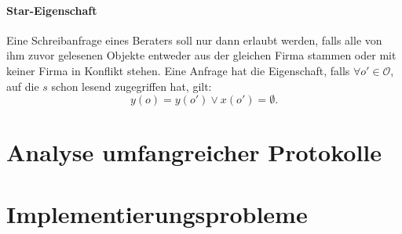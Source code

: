 \paragraph{Star-Eigenschaft}
Eine Schreibanfrage eines Beraters soll nur dann erlaubt werden, falls alle von ihm zuvor gelesenen Objekte entweder aus der gleichen Firma stammen oder mit keiner Firma in Konflikt stehen. Eine Anfrage hat die Eigenschaft, falls \(\forall o' \in \mathcal{O}\), auf die \(s\) schon lesend zugegriffen hat, gilt:
\[y(o) = y(o') \vee x(o') = \emptyset.\]



\section{Analyse umfangreicher Protokolle}



\section{Implementierungsprobleme}
